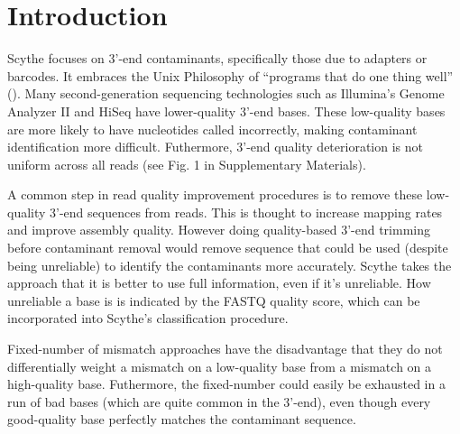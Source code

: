 \documentclass{bioinfo}
\begin{document}
\section{Introduction}
Scythe focuses on 3'-end contaminants, specifically those due to
adapters or barcodes. It embraces the Unix Philosophy of ``programs
that do one thing well'' (\citealp{raymond2003}). Many
second-generation sequencing technologies such as Illumina's Genome
Analyzer II and HiSeq have lower-quality 3'-end bases. These
low-quality bases are more likely to have nucleotides called
incorrectly, making contaminant identification more
difficult. Futhermore, 3'-end quality deterioration is not uniform
across all reads (see Fig. 1 in Supplementary Materials).

A common step in read quality improvement procedures is to remove
these low-quality 3'-end sequences from reads. This is thought to
increase mapping rates and improve assembly quality. However doing
quality-based 3'-end trimming before contaminant removal would remove
sequence that could be used (despite being unreliable) to identify the
contaminants more accurately. Scythe takes the approach that it is
better to use full information, even if it's unreliable. How
unreliable a base is is indicated by the FASTQ quality score, which
can be incorporated into Scythe's classification procedure.

Fixed-number of mismatch approaches have the disadvantage that they
do not differentially weight a mismatch on a low-quality base from a
mismatch on a high-quality base. Futhermore, the fixed-number could
easily be exhausted in a run of bad bases (which are quite common in
the 3'-end), even though every good-quality base perfectly matches the
contaminant sequence.
\end{document}
